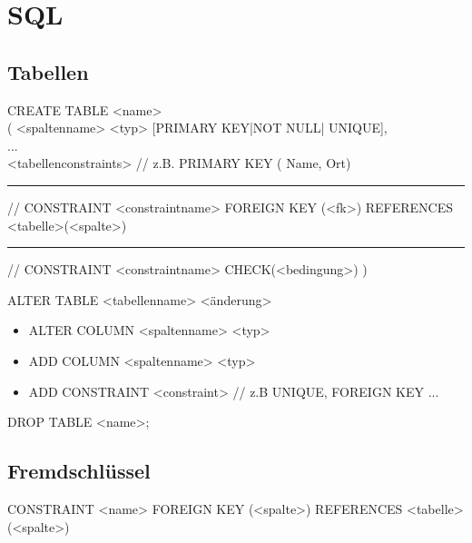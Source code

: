 \section{SQL}
\subsection{Tabellen}
CREATE TABLE <name>  \\
( <spaltenname> <typ> [PRIMARY KEY|NOT NULL| UNIQUE],    \\
... \\
<tabellenconstraints>   // z.B. PRIMARY KEY ( Name, Ort) \\
\rule{10em}{0em}// CONSTRAINT <constraintname> FOREIGN KEY (<fk>) REFERENCES <tabelle>(<spalte>)
\rule{10em}{0em}// CONSTRAINT <constraintname> CHECK(<bedingung>)
)

ALTER TABLE <tabellenname> <änderung>
\begin{itemize}
\item ALTER COLUMN <spaltenname> <typ>
\item ADD COLUMN <spaltenname> <typ> 
\item ADD CONSTRAINT <constraint> // z.B UNIQUE, FOREIGN KEY ...
\end{itemize}

DROP TABLE <name>;

\subsection*{Fremdschlüssel}
CONSTRAINT <name> FOREIGN KEY (<spalte>) REFERENCES <tabelle>(<spalte>)